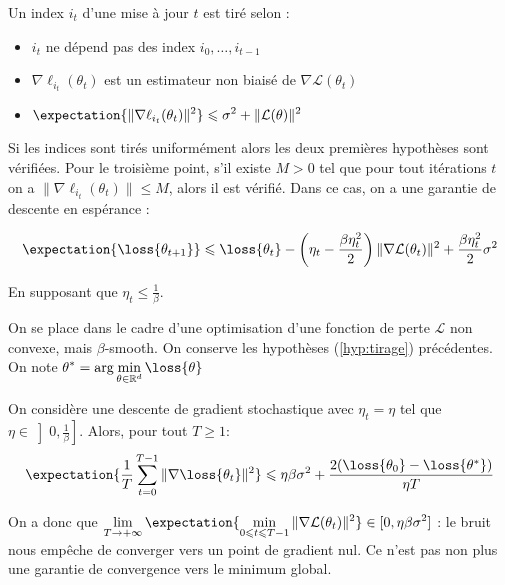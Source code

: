 \documentclass{beamer}
\begin{document}
\begin{frame}{}{}
	\begin{hypothese}
		Un index $i_t$ d'une mise à jour $t$ est tiré selon :
		\begin{itemize}
			\item $i_t$ ne dépend pas des index $i_0, \ldots, i_{t-1}$
			\item $\displaystyle \nabla \ell_{i_t}(\theta_t)$ est un estimateur non biaisé de $\nabla \mathcal{L}(\theta_t)$
			\item $\displaystyle \expectation{\|\nabla \ell_{i_t}(\theta_t)\|^2} \leqslant \sigma^2 + \|\mathcal{L}(\theta)\|^2$
		\end{itemize}
		\label{hyp:tirage}
	\end{hypothese}
	
	Si les indices sont tirés uniformément alors les deux premières hypothèses sont vérifiées. Pour le troisième point, s'il existe $M>0$ tel que pour tout itérations $t$ on a $\displaystyle \|\nabla \ell_{i_t}(\theta_t)\| \leqslant M$, alors il est vérifié. Dans ce cas, on a une garantie de descente en espérance :
	
	\begin{equation}
		\expectation{\loss{\theta_{t+1}}} \leqslant \loss{\theta_t}-\left(\eta_t-\frac{\beta\eta_t^2}{2}\right)\|\nabla \mathcal{L}(\theta_t)\|^2 + \frac{\beta\eta_t^2}{2}\sigma^2
		\label{eq:ExpectedDescent}
	\end{equation}
	
	En supposant que $\displaystyle \eta_t\leqslant \frac{1}{\beta}$.
\end{frame}




\begin{frame}{}{}
	On se place dans le cadre d'une optimisation d'une fonction de perte $\mathcal{L}$ non convexe, mais $\beta$-smooth. On conserve les hypothèses (\ref{hyp:tirage}) précédentes. On note $\displaystyle \theta^* = \arg \min_{\theta\in \mathbb{R}^d}\loss{\theta}$
	
	\begin{theoreme}
		On considère une descente de gradient stochastique avec $\eta_t=\eta$ tel que $\displaystyle \eta\in \left]0, \frac{1}{\beta}\right]$. Alors, pour tout $T \geqslant 1$:
		\begin{equation*}
			\expectation{\frac{1}{T}\sum_{t=0}^{T-1}\|\nabla\loss{\theta_t}\|^2} \leqslant \eta\beta\sigma^2 + \frac{2(\loss{\theta_0}-\loss{\theta^*})}{\eta T}
		\end{equation*}
		\label{thm:SGD_fixed_LR}
	\end{theoreme}
	
	On a donc que $\displaystyle \lim_{T\rightarrow+\infty}\expectation{\min_{0\leqslant t\leqslant T-1}\|\nabla \mathcal{L}(\theta_t)\|^2} \in [0, \eta\beta\sigma^2]$ : le bruit nous empêche de converger vers un point de gradient nul. Ce n'est pas non plus une garantie de convergence vers le minimum global.
\end{frame}
\end{document}
